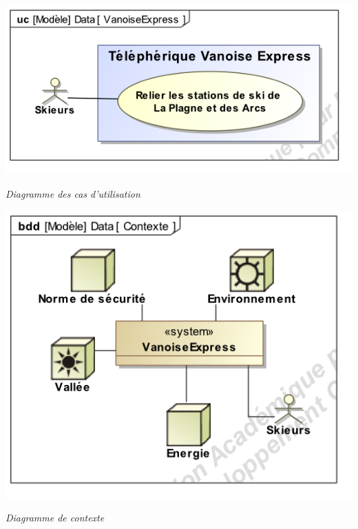 \documentclass[10pt]{article}
\begin{document}
\begin{minipage}[c]{.19\linewidth}
\begin{center}
\includegraphics[width=\textwidth]{images/uc}

\textit{Diagramme des cas d'utilisation}
\end{center}
\end{minipage} \hfill
\begin{minipage}[c]{.15\linewidth}
\begin{center}
\includegraphics[width=\textwidth]{images/contexte}

\textit{Diagramme de contexte}
\end{center}
\end{minipage} \hfill
\end{document}
